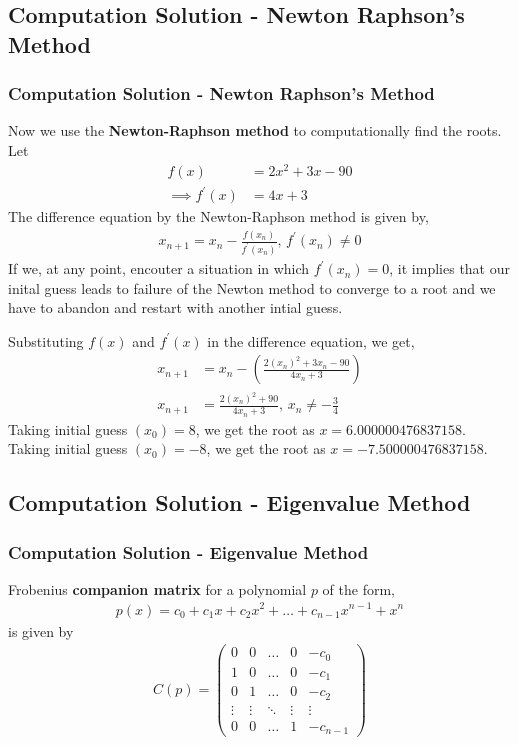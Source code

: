 \documentclass{beamer}
\providecommand{\brak}[1]{\ensuremath{\left(#1\right)}}
\theoremstyle{remark}
\newcommand{\myvec}[1]{\ensuremath{\begin{pmatrix}#1\end{pmatrix}}}
\numberwithin{equation}{section}
\begin{document}
\subsection{Computation Solution - Newton Raphson's Method}
\begin{frame}
\frametitle{Computation Solution - Newton Raphson's Method}
Now we use the \textbf{Newton-Raphson method} to computationally find the roots.
\newline
Let 
\begin{align}
  f\brak{x} &= 2x^2 + 3x - 90\\
  \implies f^{\prime}\brak{x} &= 4x + 3
\end{align}
The difference equation by the Newton-Raphson method is given by,
\begin{align}
  x_{n + 1} = x_n - \frac{f\brak{x_n}}{f^{\prime}\brak{x_n}} \text{, } f^{\prime}\brak{x_n} \neq 0
\end{align}
If we, at any point, encouter a situation in which $f^{\prime}\brak{x_n} = 0$, it implies that our inital guess leads to failure of the Newton method to converge to a root and we have to abandon and restart with another intial guess.
\end{frame}

\begin{frame}
Substituting $f\brak{x}$ and $f^{\prime}\brak{x}$ in the difference equation, we get,
\begin{align}
  x_{n + 1} &= x_n - \brak{\frac{2\brak{x_n}^2 + 3x_n - 90}{4x_n + 3}}\\
  x_{n + 1} &= \frac{2\brak{x_n}^2 + 90}{4x_n + 3} \text{, } x_n \neq -\frac{3}{4}
\end{align}
Taking initial guess $\brak{x_0} = 8$, we get the root as $x = 6.000000476837158$.
Taking initial guess $\brak{x_0} = -8$, we get the root as $x = -7.500000476837158$.
\end{frame}

\subsection{Computation Solution - Eigenvalue Method}
\begin{frame}
\frametitle{Computation Solution - Eigenvalue Method}
Frobenius \textbf{companion matrix} for a polynomial $p$ of the form,
\begin{align}
  p\brak{x} = c_0 + c_1x + c_2x^2 + \dots + c_{n - 1}x^{n - 1} + x^n
\end{align}
is given by
\begin{align}
  C\brak{p} = \myvec{0 & 0 & \dots & 0 & -c_0\\1 & 0 & \dots & 0 & -c_1\\0 & 1 & \dots & 0 & -c_2\\\vdots & \vdots & \ddots & \vdots & \vdots\\0 & 0 & \dots & 1 & -c_{n - 1}}
\end{align}
\end{frame}
\end{document}
